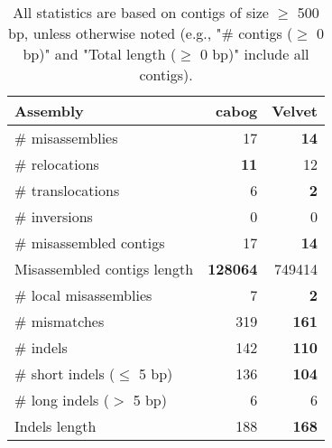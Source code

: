 \documentclass[12pt,a4paper]{article}
\begin{document}
\begin{table}[ht]
\begin{center}
\caption{All statistics are based on contigs of size $\geq$ 500 bp, unless otherwise noted (e.g., "\# contigs ($\geq$ 0 bp)" and "Total length ($\geq$ 0 bp)" include all contigs).}
\begin{tabular}{|l*{2}{|r}|}
\hline
Assembly & cabog & Velvet \\ \hline
\# misassemblies & 17 & {\bf 14} \\ \hline
\hspace{5mm}\# relocations & {\bf 11} & 12 \\ \hline
\hspace{5mm}\# translocations & 6 & {\bf 2} \\ \hline
\hspace{5mm}\# inversions & 0 & 0 \\ \hline
\# misassembled contigs & 17 & {\bf 14} \\ \hline
Misassembled contigs length & {\bf 128064} & 749414 \\ \hline
\# local misassemblies & 7 & {\bf 2} \\ \hline
\# mismatches & 319 & {\bf 161} \\ \hline
\# indels & 142 & {\bf 110} \\ \hline
\hspace{5mm}\# short indels ($\leq$ 5 bp) & 136 & {\bf 104} \\ \hline
\hspace{5mm}\# long indels ($>$ 5 bp) & 6 & 6 \\ \hline
Indels length & 188 & {\bf 168} \\ \hline
\end{tabular}
\end{center}
\end{table}
\end{document}
